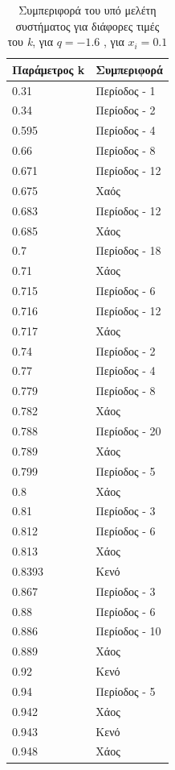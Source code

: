 \begin{table}[h!]
	\centering
	\caption{ Συμπεριφορά του υπό μελέτη συστήματος για διάφορες τιμές του \emph{k}, για $q=-1.6$ , για \(x_i=0.1\)}
	\label{tab:abc7}
	\begin{tabular}{l | l }
		Παράμετρος k & Συμπεριφορά \\
		\hline
		0.31 &  Περίοδος -  1 \\
		0.34 &  Περίοδος -  2 \\
		0.595& Περίοδος -  4 \\
		0.66& Περίοδος -  8 \\
		0.671 &  Περίοδος -  12\\
		0.675& Χαός \\
		0.683& Περίοδος -  12 \\
		0.685& Χάος \\
		0.7 &  Περίοδος -  18\\
		0.71&  Χάος \\
		0.715 &  Περίοδος -  6\\
		0.716 &  Περίοδος -  12\\
		0.717 &  Χάος \\
		0.74 & Περίοδος -  2\\
		0.77 &  Περίοδος -  4 \\
		0.779 &  Περίοδος -  8\\
		0.782 & Χάος\\
		0.788 & Περίοδος -  20\\
		0.789 & Χάος\\
		0.799 & Περίοδος -  5\\
		0.8 &Χάος\\
		0.81 & Περίοδος -  3\\
		0.812 & Περίοδος -  6\\
		0.813 & Χάος\\
		0.8393 & Κενό\\
		0.867 & Περίοδος -  3\\
		0.88 & Περίοδος -  6\\
		0.886 & Περίοδος -  10\\
		0.889 & Χάος\\
		0.92 & Κενό\\
		0.94 & Περίοδος -  5\\
		0.942 & Χάος\\
		0.943 & Κενό\\
		0.948 & Χάος\\
	\end{tabular}
\end{table}

